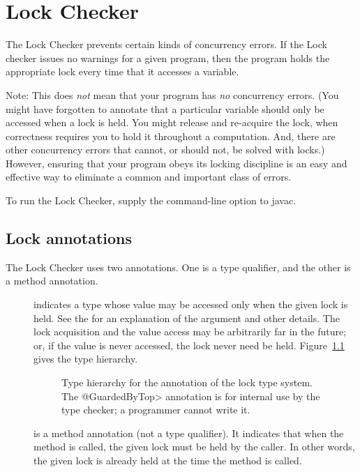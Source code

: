 \htmlhr
\chapter{Lock Checker\label{lock-checker}}

The Lock Checker prevents certain kinds of concurrency errors.  If the Lock
checker issues no warnings for a given program, then the program holds the
appropriate lock every time that it accesses a variable.

Note:  This does \emph{not} mean that your program has \emph{no} concurrency
errors.  (You might have forgotten to annotate that a particular variable
should only be accessed when a lock is held.  You might release and
re-acquire the lock, when correctness requires you to hold it throughout a
computation.  And, there are other concurrency errors that cannot, or
should not, be solved with locks.)  However, ensuring that your
program obeys its locking discipline is an easy and effective way to
eliminate a common and important class of errors.


To run the Lock Checker, supply the  command-line option to javac.


\section{Lock annotations\label{lock-annotations}}

The Lock Checker uses two annotations.  One is a type qualifier, and the
other is a method annotation.

\begin{description}

\item[]
  indicates a type whose value may be accessed only when the given lock is
  held.
  See the  for an explanation of the argument and other details.  The lock
  acquisition and the value access may be arbitrarily far in the future;
  or, if the value is never accessed, the lock never need be held.
  Figure~\ref{fig-guardedby-hierarchy} gives the type hierarchy.

\begin{figure}
\caption{Type hierarchy for the  annotation of the lock
  type system.  The \<@GuardedByTop> annotation is for internal use by the
  type checker; a programmer cannot write it.}
\label{fig-guardedby-hierarchy}
\end{figure}


\item[]
  is a method annotation (not a type qualifier).  It indicates that when
  the method is called, the given lock must be held by the caller.
  In other words, the given lock is already held at the time the method is
  called.

\end{description}

